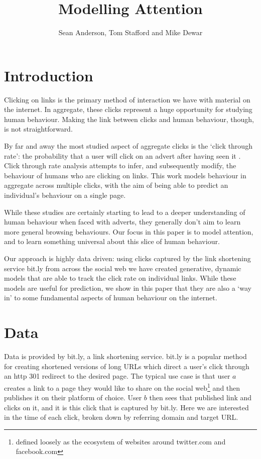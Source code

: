 \documentclass{article}
\title{Modelling Attention}
\author{Sean Anderson, Tom Stafford and Mike Dewar}
\begin{document}
    
    \maketitle
    
    \section{Introduction}
    
    Clicking on links is the primary method of interaction we have with material on the internet. In aggregate, these clicks represent a huge opportunity for studying human behaviour. Making the link between clicks and human behaviour, though, is not straightforward.
    
    By far and away the most studied aspect of aggregate clicks is the `click through rate': the probability that a user will click on an advert after having seen it \cite{}. Click through rate analysis attempts to infer, and subsequently modify, the behaviour of humans who are clicking on links. This work models behaviour in aggregate across multiple clicks, with the aim of being able to predict an individual's behaviour on a single page.
    
    
    While these studies are certainly starting to lead to a deeper understanding of human behaviour when faced with adverts, they generally don't aim to learn more general browsing behaviours. Our focus in this paper is to model attention, and to learn something universal about this slice of human behaviour.
    
    Our approach is highly data driven: using clicks captured by the link shortening service bit.ly from across the social web we have created generative, dynamic models that are able to track the click rate on individual links. While these models are useful for prediction, we show in this paper that they are also a `way in' to some fundamental aspects of human behaviour on the internet. 
    
    \section{Data}
    
    Data is provided by bit.ly, a link shortening service. bit.ly is a popular method for creating shortened versions of long URLs which direct a user's click through an http 301 redirect to the desired page. The typical use case is that user $a$ creates a link to a page they would like to share on the social web\footnote{defined loosely as the ecosystem of websites around twitter.com and facebook.com} and then publishes it on their platform of choice. User $b$ then sees that published link and clicks on it, and it is this click that is captured by bit.ly. Here we are interested in the time of each click, broken down by referring domain and target URL. 
    
\end{document}
